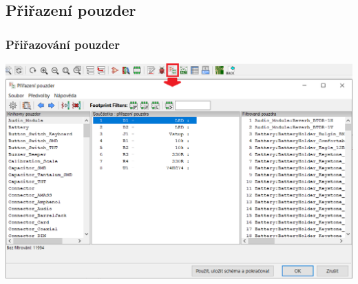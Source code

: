 \documentclass{beamer}
\begin{document}
\subsection{\texorpdfstring{Přiřazení pouzder}{Prirazeni pouzder}}
\begin{frame}
	\frametitle{Přiřazování pouzder}
	
	\begin{center}
		\includegraphics[width=\textwidth]{obr/pouzdra01.png}
	\end{center}
\end{frame}
\end{document}
